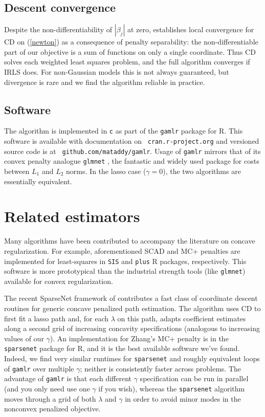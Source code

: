 \documentclass[12pt]{article}
\begin{document}
\subsection{Descent convergence}

 Despite the non-differentiability of $|\beta_j|$ at zero,
\citet{tseng_convergence_2001} establishes local convergence for CD on
(\ref{newton}) as a consequence of penalty separability: the 
non-differentiable part of our objective is a sum of functions on only a single
coordinate.  Thus CD solves each weighted least squares problem, and  the full
algorithm converges if IRLS does.  For non-Gaussian models this is not always
guaranteed, but divergence is rare and we find the algorithm reliable in
practice.


\subsection{Software}

The algorithm is implemented in {\tt c} as part of the {\tt gamlr} package for
{\sf R}. This software is available with documentation on {\tt
cran.r-project.org} and versioned source code is at {\tt
github.com/mataddy/gamlr}.  Usage of {\tt gamlr} mirrors that of its convex
penalty analogue {\tt glmnet} \citep{friedman_regularization_2010}, the
fantastic and widely used package for costs between $L_1$ and $L_2$
norms. In the lasso case ($\gamma=0$), the two algorithms are essentially
equivalent.


\section{Related estimators}
\label{lla}


Many algorithms have been contributed to accompany the literature on concave
regularization. For example, aforementioned SCAD and MC+ penalties are
implemented for least-squares  in {\tt SIS} and {\tt plus} {\sf R} packages,
respectively.  This software is more prototypical than the industrial
strength tools (like {\tt glmnet}) available for convex regularization.

The recent SparseNet framework of \citet{mazumder_sparsenet_2011} contributes
a  fast class of coordinate descent routines for generic concave penalized
path estimation. The algorithm uses CD to first fit a lasso path and, for each
$\lambda$ on this path, adapts coefficient estimates along a second grid of
increasing concavity specifications (analogous to increasing values of our
$\gamma$). An  implementation for Zhang's MC+ penalty is in the {\tt
sparsenet} package for {\sf R}, and it is the best available software we've
found.  Indeed, we find very similar runtimes for {\tt sparsenet} and roughly
equivalent loops of {\tt gamlr} over multiple $\gamma$; neither is
consistently faster across problems.  The advantage of {\tt gamlr} is that
each different $\gamma$ specification can be run in parallel (and you only
need use one $\gamma$ if you wish), whereas the {\tt sparsenet}
algorithm moves through a grid of both $\lambda$ and $\gamma$ in order to
avoid minor modes in the nonconvex penalized objective.
\end{document}
